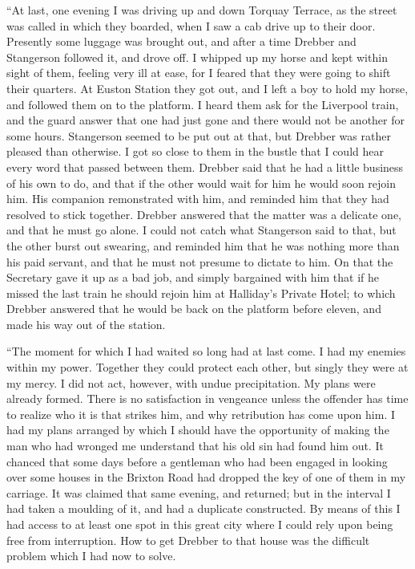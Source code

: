 \documentclass[12pt,english,oneside]{book}
\begin{document}
{}``At last, one evening I was driving up and down Torquay Terrace,
as the street was called in which they boarded, when I saw a cab drive
up to their door. Presently some luggage was brought out, and after
a time Drebber and Stangerson followed it, and drove off. I whipped
up my horse and kept within sight of them, feeling very ill at ease,
for I feared that they were going to shift their quarters. At Euston
Station they got out, and I left a boy to hold my horse, and followed
them on to the platform. I heard them ask for the Liverpool train,
and the guard answer that one had just gone and there would not be
another for some hours. Stangerson seemed to be put out at that, but
Drebber was rather pleased than otherwise. I got so close to them
in the bustle that I could hear every word that passed between them.
Drebber said that he had a little business of his own to do, and that
if the other would wait for him he would soon rejoin him. His companion
remonstrated with him, and reminded him that they had resolved to
stick together. Drebber answered that the matter was a delicate one,
and that he must go alone. I could not catch what Stangerson said
to that, but the other burst out swearing, and reminded him that he
was nothing more than his paid servant, and that he must not presume
to dictate to him. On that the Secretary gave it up as a bad job,
and simply bargained with him that if he missed the last train he
should rejoin him at Halliday's Private Hotel; to which Drebber answered
that he would be back on the platform before eleven, and made his
way out of the station.

{}``The moment for which I had waited so long had at last come. I
had my enemies within my power. Together they could protect each other,
but singly they were at my mercy. I did not act, however, with undue
precipitation. My plans were already formed. There is no satisfaction
in vengeance unless the offender has time to realize who it is that
strikes him, and why retribution has come upon him. I had my plans
arranged by which I should have the opportunity of making the man
who had wronged me understand that his old sin had found him out.
It chanced that some days before a gentleman who had been engaged
in looking over some houses in the Brixton Road had dropped the key
of one of them in my carriage. It was claimed that same evening, and
returned; but in the interval I had taken a moulding of it, and had
a duplicate constructed. By means of this I had access to at least
one spot in this great city where I could rely upon being free from
interruption. How to get Drebber to that house was the difficult problem
which I had now to solve.
\end{document}
